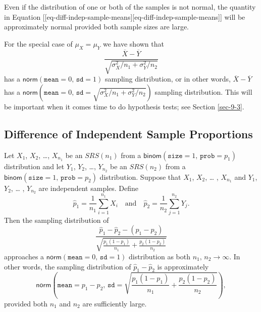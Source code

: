 \documentclass[captions=tableheading]{scrbook}
\begin{document}
\begin{rem}
Even if the distribution of one or both of the samples is not normal, the quantity in Equation [[eq-diff-indep-sample-means][eq-diff-indep-sample-means]] will be approximately normal provided both sample sizes are large.
\end{rem}

\begin{rem}
For the special case of \(\mu_{X}=\mu_{Y}\) we have shown that 
\begin{equation} \frac{\overline{X}-\overline{Y}}{\sqrt{\sigma_{X}^{2}/n_{1}+\sigma_{Y}^{2}/n_{2}}}
\end{equation}
has a \(\mathsf{norm}(\mathtt{mean}=0,\,\mathtt{sd}=1)\) sampling distribution, or in other words, \(\overline{X}-\overline{Y}\) has a \(\mathsf{norm}(\mathtt{mean}=0,\,\mathtt{sd}=\sqrt{\sigma_{X}^{2}/n_{1}+\sigma_{Y}^{2}/n_{2}})\) sampling distribution. This will be important when it comes time to do hypothesis tests; see Section \ref{sec-9-3}.
\end{rem}
\subsection{Difference of Independent Sample Proportions}
\label{sec-8-4-2}


\begin{prop}
Let \(X_{1}\), \(X_{2}\), \ldots{}, \(X_{n_{1}}\) be an \(SRS(n_{1})\) from a \(\mathsf{binom}(\mathtt{size}=1,\,\mathtt{prob}=p_{1})\) distribution and let \(Y_{1}\), \(Y_{2}\), \ldots{}, \(Y_{n_{2}}\) be an \(SRS(n_{2})\) from a \(\mathsf{binom}(\mathtt{size}=1,\,\mathtt{prob}=p_{2})\) distribution. Suppose that \(X_{1}\), \(X_{2}\), \ldots{} , \(X_{n_{1}}\) and \(Y_{1}\), \(Y_{2}\), \ldots{} , \(Y_{n_{2}}\) are independent samples. Define 
\begin{equation}
\hat{p}_{1}=\frac{1}{n_{1}}\sum_{i=1}^{n_{1}}X_{i}\quad \mbox{and}\quad \hat{p}_{2}=\frac{1}{n_{2}}\sum_{j=1}^{n_{2}}Y_{j}.
\end{equation}
Then the sampling distribution of
\begin{equation}
\frac{\hat{p}_{1}-\hat{p}_{2}-(p_{1}-p_{2})}{\sqrt{\frac{p_{1}(1-p_{1})}{n_{1}}+\frac{p_{2}(1-p_{2})}{n_{2}}}}
\end{equation}
approaches a \(\mathsf{norm}(\mathtt{mean}=0,\,\mathtt{sd}=1)\) distribution as both \(n_{1},\, n_{2}\to\infty\). In other words, the sampling distribution of \(\hat{p}_{1}-\hat{p}_{2}\) is approximately
\begin{equation}
\mathsf{norm}\left(\mathtt{mean}=p_{1}-p_{2},\,\mathtt{sd}=\sqrt{\frac{p_{1}(1-p_{1})}{n_{1}}+\frac{p_{2}(1-p_{2})}{n_{2}}}\right),
\end{equation}
provided both \(n_{1}\) and \(n_{2}\) are sufficiently large.
\end{prop}
\end{document}
